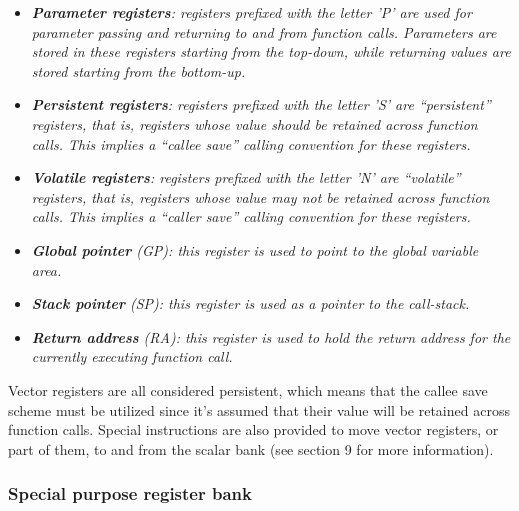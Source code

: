             \begin{itemize}

                \item \textit{\textbf{Parameter registers}: registers prefixed with the letter 'P' are used for parameter passing and returning to and from function calls. Parameters are stored in these registers starting from the top-down, while returning values are stored starting from the bottom-up.}

                \item \textit{\textbf{Persistent registers}: registers prefixed with the letter 'S' are ``persistent'' registers, that is, registers whose value should be retained across function calls. This implies a ``callee save'' calling convention for these registers.}

                \item \textit{\textbf{Volatile registers}: registers prefixed with the letter 'N' are ``volatile'' registers, that is, registers whose value may not be retained across function calls. This implies a ``caller save'' calling convention for these registers.}

                \item \textit{\textbf{Global pointer} (GP): this register is used to point to the global variable area.}
                \item \textit{\textbf{Stack pointer} (SP): this register is used as a pointer to the call-stack.}
                \item \textit{\textbf{Return address} (RA): this register is used to hold the return address for the currently executing function call.}

            \end{itemize}

            Vector registers are all considered persistent, which means that the callee save scheme must be utilized since it's assumed that their value will be retained across function calls. Special instructions are also provided to move vector registers, or part of them, to and from the scalar bank (see section 9 for more information).

        \subsubsection{Special purpose register bank}

            \vspace{10pt}

